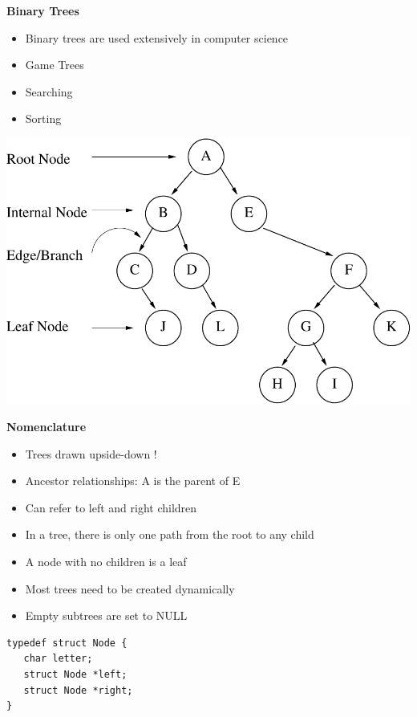 \documentclass[a4,portraitt]{slides}
\begin{document}
\newpage
{\samepage
\begin{center}
{\Large{\bf Binary Trees}}
\end{center}
\begin{itemize}
\item Binary trees are used extensively in computer science
\item Game Trees
\item Searching
\item Sorting
\end{itemize}
\begin{center}
\includegraphics{../Images/treenom.pdf}
\end{center}
}

\newpage
{\samepage
\begin{center}
{\Large{\bf Nomenclature}}
\end{center}
\begin{itemize}
\item Trees drawn upside-down !
\item Ancestor relationships: A is the parent of E
\item Can refer to left and right children
\item In a tree, there is only one path from the root to any child
\item A node with no children is a leaf
\item Most trees need to be created dynamically
\item Empty subtrees are set to NULL
\end{itemize}
\begin{verbatim}
typedef struct Node {
   char letter;
   struct Node *left;
   struct Node *right;
}
\end{verbatim}
}
\end{document}
